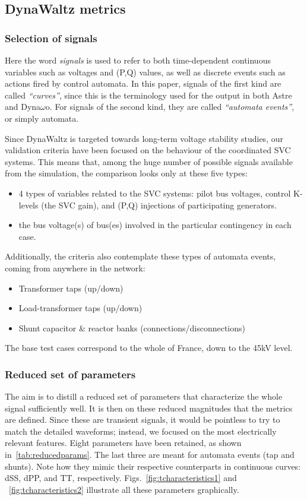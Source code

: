 \documentclass[conference]{IEEEtran}
\begin{document}
\subsection{DynaWaltz metrics}

\subsubsection{Selection of signals}
Here the word \emph{signals} is used to refer to both time-dependent continuous
variables such as voltages and (P,Q) values, as well as discrete events such as
actions fired by control automata. In this paper, signals of the
first kind are called \emph{``curves''}, since this is the terminology used for the
output in both Astre and Dyna$\omega$o. For signals of the second kind, they are
called \emph{``automata events''}, or simply automata.

Since DynaWaltz is targeted towards long-term voltage stability studies, our
validation criteria have been focused on the behaviour of the coordinated SVC systems. This means that, among the huge number
of possible signals available from the simulation, the comparison looks only at
these five types:
\begin{itemize}
  \item 4 types of variables related to the SVC systems: pilot bus voltages,
        control K-levels (the SVC gain), and (P,Q) injections of participating
        generators.
  \item the bus voltage(s) of bus(es) involved in the particular
        contingency in each case.
\end{itemize}
Additionally, the criteria also contemplate these types of automata events,
coming from anywhere in the network:
\begin{itemize}
  \item Transformer taps (up/down)
  \item Load-transformer taps (up/down)
  \item Shunt capacitor \& reactor banks  (connections/disconnections)
\end{itemize}
The base test cases correspond to the whole of France, down to the 45kV
level.


\subsubsection{Reduced set of parameters}
The aim is to distill a reduced set of parameters that characterize the whole
signal sufficiently well. It is then on these reduced
magnitudes that the metrics are defined.  Since these are transient signals,
it would be pointless to try to match the detailed waveforms; instead, we
focused on the most electrically relevant features.  Eight parameters have been retained, as shown
in~\ref{tab:reducedparams}. The last three are meant for automata events (tap
and shunts). Note how they mimic their respective counterparts in continuous
curves: dSS, dPP, and TT, respectively. Figs.~\ref{fig:tcharacteristics1} and
~\ref{fig:tcharacteristics2} illustrate all these parameters graphically.
\end{document}
